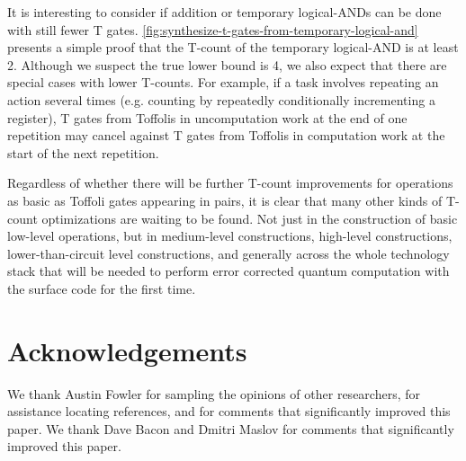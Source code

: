 \documentclass[twocolumn]{quantumarticle-customized}
\begin{document}
It is interesting to consider if addition or temporary logical-ANDs can be done with still fewer T gates.
\autoref{fig:synthesize-t-gates-from-temporary-logical-and} presents a simple proof that the T-count of the temporary logical-AND is at least 2.
Although we suspect the true lower bound is 4, we also expect that there are special cases with lower T-counts.
For example, if a task involves repeating an action several times (e.g. counting by repeatedly conditionally incrementing a register), T gates from Toffolis in uncomputation work at the end of one repetition may cancel against T gates from Toffolis in computation work at the start of the next repetition.

Regardless of whether there will be further T-count improvements for operations as basic as Toffoli gates appearing in pairs, it is clear that many other kinds of T-count optimizations are waiting to be found.
Not just in the construction of basic low-level operations, but in medium-level constructions, high-level constructions, lower-than-circuit level constructions, and generally across the whole technology stack that will be needed to perform error corrected quantum computation with the surface code for the first time.


\section*{Acknowledgements}

We thank Austin Fowler for sampling the opinions of other researchers, for assistance locating references, and for comments that significantly improved this paper.
We thank Dave Bacon and Dmitri Maslov for comments that significantly improved this paper.



\end{document}
